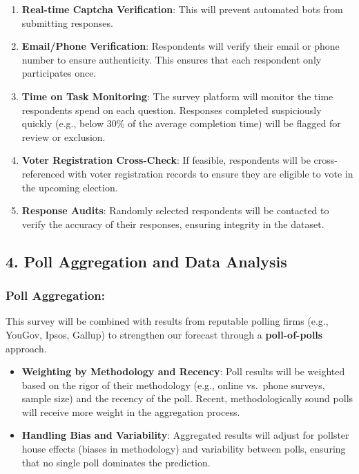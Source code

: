 \documentclass[
  letterpaper,
  DIV=11,
  numbers=noendperiod]{scrartcl}
\providecommand{\tightlist}{%
  \setlength{\itemsep}{0pt}\setlength{\parskip}{0pt}}\usepackage{longtable,booktabs,array}
\begin{document}
\begin{enumerate}
\def\labelenumi{\arabic{enumi}.}
\tightlist
\item
  \textbf{Real-time Captcha Verification}: This will prevent automated
  bots from submitting responses.
\item
  \textbf{Email/Phone Verification}: Respondents will verify their email
  or phone number to ensure authenticity. This ensures that each
  respondent only participates once.
\item
  \textbf{Time on Task Monitoring}: The survey platform will monitor the
  time respondents spend on each question. Responses completed
  suspiciously quickly (e.g., below 30\% of the average completion time)
  will be flagged for review or exclusion.
\item
  \textbf{Voter Registration Cross-Check}: If feasible, respondents will
  be cross-referenced with voter registration records to ensure they are
  eligible to vote in the upcoming election.
\item
  \textbf{Response Audits}: Randomly selected respondents will be
  contacted to verify the accuracy of their responses, ensuring
  integrity in the dataset.
\end{enumerate}

\subsection{\texorpdfstring{\textbf{4. Poll Aggregation and Data
Analysis}}{4. Poll Aggregation and Data Analysis}}\label{poll-aggregation-and-data-analysis}

\subsubsection{\texorpdfstring{\textbf{Poll
Aggregation}:}{Poll Aggregation:}}\label{poll-aggregation}

This survey will be combined with results from reputable polling firms
(e.g., YouGov, Ipsos, Gallup) to strengthen our forecast through a
\textbf{poll-of-polls} approach.

\begin{itemize}
\tightlist
\item
  \textbf{Weighting by Methodology and Recency}: Poll results will be
  weighted based on the rigor of their methodology (e.g., online
  vs.~phone surveys, sample size) and the recency of the poll. Recent,
  methodologically sound polls will receive more weight in the
  aggregation process.
\item
  \textbf{Handling Bias and Variability}: Aggregated results will adjust
  for pollster house effects (biases in methodology) and variability
  between polls, ensuring that no single poll dominates the prediction.
\end{itemize}
\end{document}
